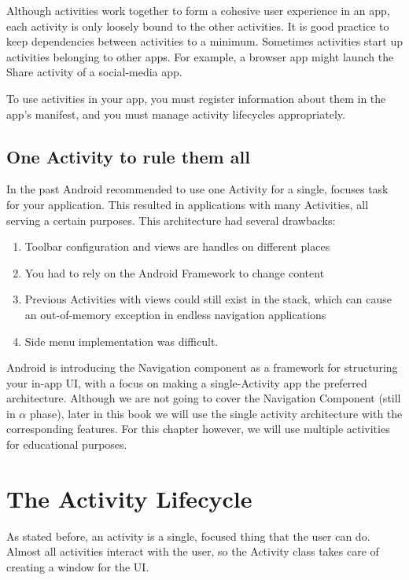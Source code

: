 Although activities work together to form a cohesive user experience in an app, each activity is only loosely bound to the other activities.
It is good practice to keep dependencies between activities to a minimum.
Sometimes activities start up activities belonging to other apps.
For example, a browser app might launch the Share activity of a social-media app.

To use activities in your app, you must register information about them in the app’s manifest, and you must manage activity lifecycles appropriately.

\subsection{One Activity to rule them all}
\label{sec:oneactivity}
In the past Android recommended to use one Activity for a single, focuses task for your application.
This resulted in applications with many Activities, all serving a certain purposes.
This architecture had several drawbacks:

\begin{enumerate}
	\item Toolbar configuration and views are handles on different places
	\item You had to rely on the Android Framework to change content
	\item Previous Activities with views could still exist in the stack, which can cause an out-of-memory exception in endless navigation applications
	\item Side menu implementation was difficult.
\end{enumerate}

Android is introducing the Navigation component as a framework for structuring your in-app UI, with a focus on making a single-Activity app the preferred architecture.
Although we are not going to cover the Navigation Component (still in $\alpha$ phase), later in this book we will use the single activity architecture with the corresponding features.
For this chapter however, we will use multiple activities for educational purposes.

\section{The Activity Lifecycle}
As stated before, an activity is a single, focused thing that the user can do.
Almost all activities interact with the user, so the Activity class takes care of creating a window for the UI.

